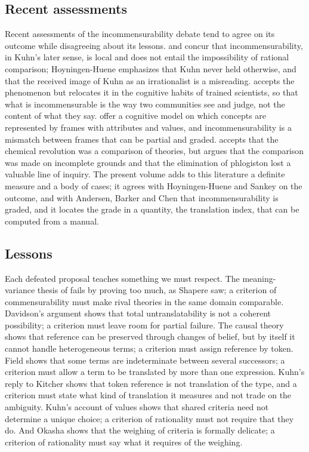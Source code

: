\documentclass{situationist-preprint}
\begin{document}
\subsection{Recent assessments}

Recent assessments of the incommensurability debate tend to agree on its outcome while disagreeing about its lessons. \citet{Sankey1997} and \citet{HoyningenHuene1993} concur that incommensurability, in Kuhn's later sense, is local and does not entail the impossibility of rational comparison; Hoyningen-Huene emphasizes that Kuhn never held otherwise, and that the received image of Kuhn as an irrationalist is a misreading. \citet{Bird2000,Bird2008} accepts the phenomenon but relocates it in the cognitive habits of trained scientists, so that what is incommensurable is the way two communities see and judge, not the content of what they say. \citet{AndersenBarkerChen2006} offer a cognitive model on which concepts are represented by frames with attributes and values, and incommensurability is a mismatch between frames that can be partial and graded. \citet{Chang2012} accepts that the chemical revolution was a comparison of theories, but argues that the comparison was made on incomplete grounds and that the elimination of phlogiston lost a valuable line of inquiry. The present volume adds to this literature a definite measure and a body of cases; it agrees with Hoyningen-Huene and Sankey on the outcome, and with Andersen, Barker and Chen that incommensurability is graded, and it locates the grade in a quantity, the translation index, that can be computed from a manual.


\subsection{Lessons}

Each defeated proposal teaches something we must respect. The meaning-variance thesis of \citet{Feyerabend1962} fails by proving too much, as Shapere saw; a criterion of commensurability must make rival theories in the same domain comparable. Davidson's argument shows that total untranslatability is not a coherent possibility; a criterion must leave room for partial failure. The causal theory shows that reference can be preserved through changes of belief, but by itself it cannot handle heterogeneous terms; a criterion must assign reference by token. Field shows that some terms are indeterminate between several successors; a criterion must allow a term to be translated by more than one expression. Kuhn's reply to Kitcher shows that token reference is not translation of the type, and a criterion must state what kind of translation it measures and not trade on the ambiguity. Kuhn's account of values shows that shared criteria need not determine a unique choice; a criterion of rationality must not require that they do. And Okasha shows that the weighing of criteria is formally delicate; a criterion of rationality must say what it requires of the weighing.
\end{document}
